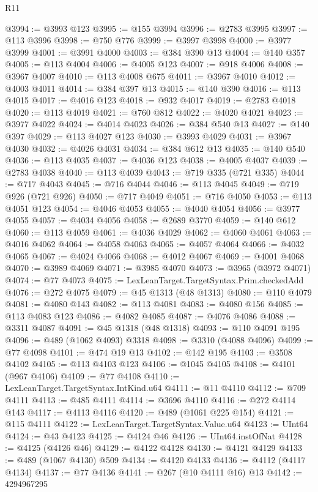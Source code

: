 \begin{lexlean}{R11}
\begin{coremodule}
{{{{{{{{{{{{{{{{{{{{{{{{{{{{{{{{{{{{{{{{{{{{{{{{{{{{{{{{{{{{{{{{{{{{{{{{{{{{{{{{{{{{{{{{{{{{{{{{{{{{{{{{{{@3994 := @3993 @123
@3995 := @155 @3994
@3996 := @2783 @3995
@3997 := @113 @3996
@3998 := @750 @776
@3999 := @3997 @3998
@4000 := @3977 @3999
@4001 := @3991 @4000
@4003 := @384 @390 @13
@4004 := @140 @357
@4005 := @113 @4004
@4006 := @4005 @123
@4007 := @918 @4006
@4008 := @3967 @4007
@4010 := @113 @4008 @675
@4011 := @3967 @4010
@4012 := @4003 @4011
@4014 := @384 @397 @13
@4015 := @140 @390
@4016 := @113 @4015
@4017 := @4016 @123
@4018 := @932 @4017
@4019 := @2783 @4018
@4020 := @113 @4019
@4021 := @760 @812
@4022 := @4020 @4021
@4023 := @3977 @4022
@4024 := @4014 @4023
@4026 := @384 @540 @13
@4027 := @140 @397
@4029 := @113 @4027 @123
@4030 := @3993 @4029
@4031 := @3967 @4030
@4032 := @4026 @4031
@4034 := @384 @612 @13
@4035 := @140 @540
@4036 := @113 @4035
@4037 := @4036 @123
@4038 := @4005 @4037
@4039 := @2783 @4038
@4040 := @113 @4039
@4043 := @719 @335 (@721 @335)
@4044 := @717 @4043
@4045 := @716 @4044
@4046 := @113 @4045
@4049 := @719 @926 (@721 @926)
@4050 := @717 @4049
@4051 := @716 @4050
@4053 := @113 @4051 @123
@4054 := @4046 @4053
@4055 := @4040 @4054
@4056 := @3977 @4055
@4057 := @4034 @4056
@4058 := @2689 @3770
@4059 := @140 @612
@4060 := @113 @4059
@4061 := @4036 @4029
@4062 := @4060 @4061
@4063 := @4016 @4062
@4064 := @4058 @4063
@4065 := @4057 @4064
@4066 := @4032 @4065
@4067 := @4024 @4066
@4068 := @4012 @4067
@4069 := @4001 @4068
@4070 := @3989 @4069
@4071 := @3985 @4070
@4073 := @3965 (@3972 @4071)
@4074 := @77 @4073
@4075 := LexLeanTarget.TargetSyntax.Prim.checkedAdd
@4076 := @272 @4075
@4079 := @45 @1313 (@48 @1313)
@4080 := @110 @4079
@4081 := @4080 @143
@4082 := @113 @4081
@4083 := @4080 @156
@4085 := @113 @4083 @123
@4086 := @4082 @4085
@4087 := @4076 @4086
@4088 := @3311 @4087
@4091 := @45 @1318 (@48 @1318)
@4093 := @110 @4091 @195
@4096 := @489 (@1062 @4093) @3318
@4098 := @3310 (@4088 @4096)
@4099 := @77 @4098
@4101 := @474 @19 @13
@4102 := @142 @195
@4103 := @3508 @4102
@4105 := @113 @4103 @123
@4106 := @1045 @4105
@4108 := @4101 (@967 @4106)
@4109 := @77 @4108
@4110 := LexLeanTarget.TargetSyntax.IntKind.u64
@4111 := @11 @4110
@4112 := @709 @4111
@4113 := @485 @4111
@4114 := @3696 @4110
@4116 := @272 @4114 @143
@4117 := @4113 @4116
@4120 := @489 (@1061 @225 @154)
@4121 := @115 @4111
@4122 := LexLeanTarget.TargetSyntax.Value.u64
@4123 := UInt64
@4124 := @43 @4123
@4125 := @4124 @46
@4126 := UInt64.instOfNat
@4128 := @4125 (@4126 @46)
@4129 := @4122 @4128
@4130 := @4121 @4129
@4133 := @489 (@1067 @4130) @509
@4134 := @4120 @4133
@4136 := @4112 (@4117 @4134)
@4137 := @77 @4136
@4141 := @267 (@10 @4111 @16) @13
@4142 := 4294967295
}}}}}}}}}}}}}}}}}}}}}}}}}}}}}}}}}}}}}}}}}}}}}}}}}}}}}}}}}}}}}}}}}}}}}}}}}}}}}}}}}}}}}}}}}}}}}}}}}}}}}}}}}}
\end{coremodule}
\end{lexlean}
